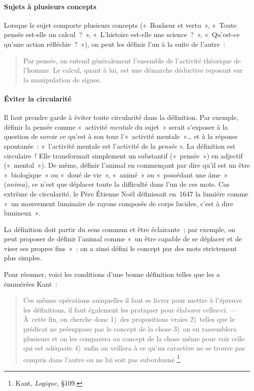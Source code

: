 \documentclass[a4paper,12pt]{article}
\begin{document}
\paragraph{Sujets à plusieurs concepts}
\label{sec-2-2-1-6}

Lorsque le sujet comporte plusieurs concepts (« Bonheur et vertu », « Toute
pensée est-elle un calcul ? », « L'histoire est-elle une science ? »,
« Qu'est-ce qu'une action réfléchie ? »), on peut les définir l'un à la
suite de l'autre :

\begin{quote}
Par pensée, on entend généralement l'ensemble de l'activité théorique
de l'homme. Le calcul, quant à lui, est une démarche déductive
reposant sur la manipulation de signes.
\end{quote}

\paragraph{Éviter la circularité}
\label{sec-2-2-1-7}

Il faut prendre garde à éviter toute circularité dans la définition. Par
exemple, définir la pensée comme « activité \emph{mentale} du sujet » serait
s'exposer à la question de savoir ce qu'est à son tour l'« activité
mentale »\ldots{} et à la réponse spontanée : « l'activité mentale est
l'activité de la \emph{pensée} ». La définition est circulaire ! Elle
transformait simplement un substantif (« pensée ») en adjectif
(« mental »). De même, définir l'animal en commençant par dire qu'il est
un être « biologique » ou « doué de vie », « animé » ou « possédant une
âme » (\emph{anima}), ce n'est que déplacer toute la difficulté dans l'un de
ces mots. Cas extrême de circularité, le Père Étienne Noël définissait
en 1647 la lumière comme « un mouvement luminaire de rayons composés de
corps lucides, c'est à dire lumineux ».

La définition doit partir du sens commun et être éclairante ; par
exemple, on peut proposer de définir l'animal comme « un être capable de
se déplacer et de viser ses propres fins » : on a ainsi défini le
concept par des mots strictement plus simples.

Pour résumer, voici les conditions d'une bonne définition telles que les
a énumérées Kant :

\begin{quote}
Ces mêmes opérations auxquelles il faut se livrer pour mettre à
l'épreuve les définitions, il faut également les pratiquer pour
élaborer celles-ci. --- À cette fin, on cherche donc 1) des
propositions vraies 2) telles que le prédicat ne présuppose pas le
concept de la chose 3) on en rassemblera plusieurs et on les comparera
au concept de la chose même pour voir celle qui est adéquate 4) enfin
on veillera à ce qu'un caractère ne se trouve pas compris dans l'autre
ou ne lui soit pas subordonné \footnote{Kant, \emph{Logique}, §109.}.
\end{quote}
\end{document}

